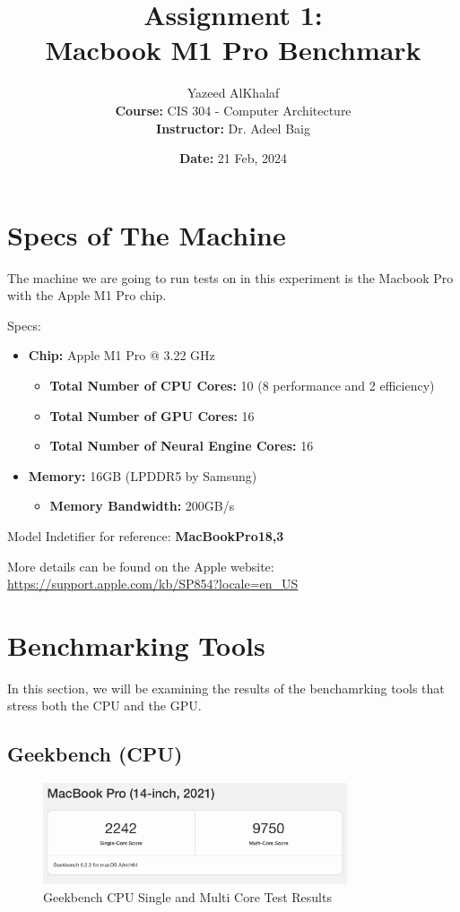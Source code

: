 \documentclass[a4paper]{article}
\title{\textbf{Assignment 1:\\Macbook M1 Pro Benchmark}}
\author{
    Yazeed AlKhalaf\\
    \textbf{Course:} CIS 304 - Computer Architecture\\
    \textbf{Instructor:} Dr. Adeel Baig
}
\date{\textbf{Date:} 21 Feb, 2024}
\begin{document}
\maketitle

\newpage

\tableofcontents

\newpage

\section{Specs of The Machine}

The machine we are going to run tests on in this experiment is the Macbook Pro with the Apple M1 Pro chip.

Specs:
\begin{itemize}
    \item \textbf{Chip:} Apple M1 Pro @ 3.22 GHz
    \begin{itemize}
        \item \textbf{Total Number of CPU Cores:} 10 (8 performance and 2 efficiency)
        \item \textbf{Total Number of GPU Cores:} 16
        \item \textbf{Total Number of Neural Engine Cores:} 16
    \end{itemize}
    \item \textbf{Memory:} 16GB (LPDDR5 by Samsung)
    \begin{itemize}
        \item \textbf{Memory Bandwidth:} 200GB/s
    \end{itemize}
\end{itemize}

Model Indetifier for reference: \textbf{MacBookPro18,3}

More details can be found on the Apple website: \url{https://support.apple.com/kb/SP854?locale=en_US}

\section{Benchmarking Tools}

In this section, we will be examining the results of the benchamrking tools that stress both the CPU and the GPU.

\subsection{Geekbench (CPU)}

\begin{figure}[h!]
    \centering
    \includegraphics[width=0.8\textwidth]{images/geekbench-single-multi-core.png}
    \caption{Geekbench CPU Single and Multi Core Test Results}
    \label{fig:geekbench-single-multi-core}
\end{figure}
\end{document}
